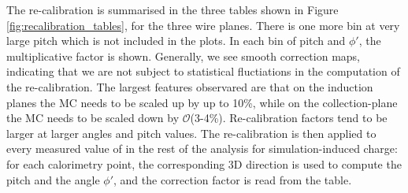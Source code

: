 The re-calibration is summarised in the three tables shown in Figure \ref{fig:recalibration_tables}, for the three wire planes.
There is one more bin at very large pitch which is not included in the plots.
In each bin of pitch and $\phi'$, the multiplicative factor is shown.  Generally, we see smooth correction maps, indicating that we are not subject to statistical fluctiations in the computation of the re-calibration. The largest features observared are that on the induction planes the MC needs to be scaled up by up to 10\%, while on the collection-plane the MC needs to be scaled down by $\mathcal{O}$(3-4\%). Re-calibration factors tend to be larger at larger angles and pitch values.
The re-calibration is then applied to every measured value of \dqdx in the rest of the analysis for simulation-induced charge: for each calorimetry point, the corresponding 3D direction is used to compute the pitch and the angle $\phi'$, and the correction factor is read from the table.

